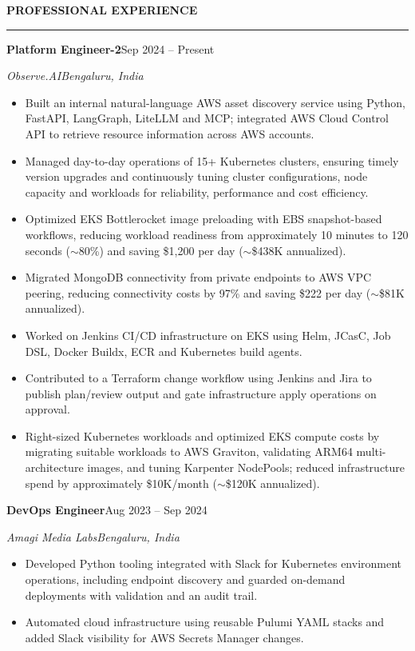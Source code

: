 \documentclass{resume} %
\def\sectionskip{\vspace{0.42em}}
\def\sectionlineskip{\vspace{0.12em}}
\newcommand{\pipe}{\hspace{0.35em}\textbar\hspace{0.35em}}
\renewenvironment{rSection}[1]{%
  \sectionskip
  \MakeUppercase{\textbf{#1}}%
  \sectionlineskip
  \hrule
  \begin{list}{}{%
    \setlength{\leftmargin}{0em}%
    \setlength{\topsep}{0.22em}%
    \setlength{\partopsep}{0pt}%
    \setlength{\parsep}{0pt}%
    \setlength{\itemsep}{0pt}%
  }%
  \item[]%
}{%
  \end{list}%
}
\newcommand{\role}[2]{\textbf{#1}\pipe #2\par\vspace{0.02em}}
\begin{document}
\begin{rSection}{Professional Experience}

\role{Platform Engineer-2}{Sep 2024 -- Present}
\textit{Observe.AI\pipe Bengaluru, India}

\begin{itemize}
    \item Built an internal natural-language AWS asset discovery service using Python, FastAPI, LangGraph, LiteLLM and MCP; integrated AWS Cloud Control API to retrieve resource information across AWS accounts.
    \item Managed day-to-day operations of 15+ Kubernetes clusters, ensuring timely version upgrades and continuously tuning cluster configurations, node capacity and workloads for reliability, performance and cost efficiency.
    \item Optimized EKS Bottlerocket image preloading with EBS snapshot-based workflows, reducing workload readiness from approximately 10 minutes to 120 seconds ($\sim$80\%) and saving \$1,200 per day ($\sim$\$438K annualized).
    \item Migrated MongoDB connectivity from private endpoints to AWS VPC peering, reducing connectivity costs by 97\% and saving \$222 per day ($\sim$\$81K annualized).
    \item Worked on Jenkins CI/CD infrastructure on EKS using Helm, JCasC, Job DSL, Docker Buildx, ECR and Kubernetes build agents.
    \item Contributed to a Terraform change workflow using Jenkins and Jira to publish plan/review output and gate infrastructure apply operations on approval.
    \item Right-sized Kubernetes workloads and optimized EKS compute costs by migrating suitable workloads to AWS Graviton, validating ARM64 multi-architecture images, and tuning Karpenter NodePools; reduced infrastructure spend by approximately \$10K/month ($\sim$\$120K annualized).
\end{itemize}

\vspace{0.22em}
\role{DevOps Engineer}{Aug 2023 -- Sep 2024}
\textit{Amagi Media Labs\pipe Bengaluru, India}

\begin{itemize}
    \item Developed Python tooling integrated with Slack for Kubernetes environment operations, including endpoint discovery and guarded on-demand deployments with validation and an audit trail.
    \item Automated cloud infrastructure using reusable Pulumi YAML stacks and added Slack visibility for AWS Secrets Manager changes.
\end{itemize}


\end{rSection}
\end{document}
